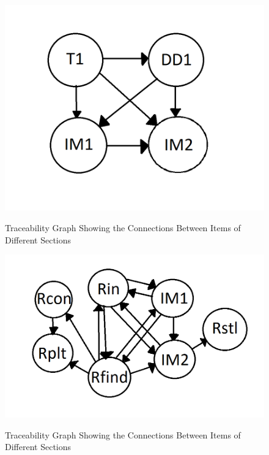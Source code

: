 \documentclass[12pt]{article}
\begin{document}
\begin{figure}[h!]
	\begin{center}
		
		{
			\includegraphics[width=\textwidth]{ATrace.png}
		}
		\caption{\label{Fig_ATrace} Traceability Graph Showing the Connections 
		Between Items of Different Sections}
 	\end{center}
 \end{figure}

\begin{figure}[h!]
	\begin{center}
		{
			\includegraphics[width=\textwidth]{RTrace.png}
		}
 		\caption{\label{Fig_RTrace} Traceability Graph Showing the Connections 
 			Between Items of Different Sections}
	\end{center}
\end{figure}
\end{document}
